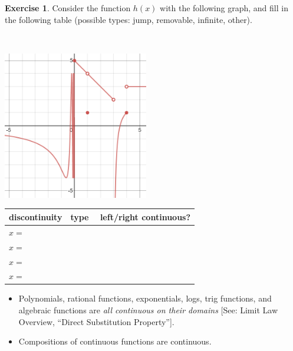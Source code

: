 \documentclass[11pt,reqno,final]{amsart}
\numberwithin{equation}{section}
\numberwithin{figure}{section}
\theoremstyle{definition} %
\newtheorem{exercise}[question]{Exercise}
\begin{document}
\begin{exercise}
        Consider the function $h(x)$ with the following graph, and fill in the following table
        (possible types: jump, removable, infinite, other).

        $ $
        \begin{minipage}{.5\textwidth}
                \begin{center}
                        \includegraphics[width=2.5in]{09-25P_graph2.png}
                \end{center}
        \end{minipage}
        \begin{minipage}{.5\textwidth}
                {\renewcommand{\arraystretch}{2}%
                  \begin{center}
                          \begin{tabular}{l|c|c}
                            discontinuity & \quad type \quad $ $& \quad left/right continuous? \\ \hline
                            $x=$ \qquad && \\
                            $x=$ && \\
                            $x=$ && \\
                            $x=$ &&\\
                          \end{tabular}
                  \end{center}
                }
        \end{minipage}
\end{exercise}

\begin{framed}
        \begin{itemize}
        \item Polynomials, rational functions, exponentials, logs, trig functions, and algebraic functions are \textit{all continuous on their domains} [See: Limit Law Overview, ``Direct Substitution Property''].
        \item Compositions of continuous functions are continuous.
        \end{itemize}
\end{framed}
\end{document}
